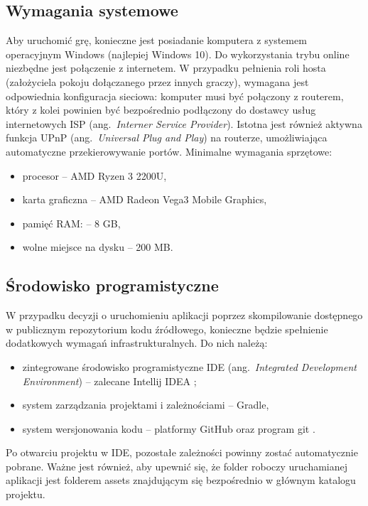 \subsection{Wymagania systemowe}
Aby uruchomić grę, konieczne jest posiadanie komputera z systemem operacyjnym Windows (najlepiej Windows 10). Do wykorzystania trybu online niezbędne jest połączenie z internetem. W przypadku pełnienia roli hosta (założyciela pokoju dołączanego przez innych graczy), wymagana jest odpowiednia konfiguracja sieciowa: komputer musi być połączony z routerem, który z kolei powinien być bezpośrednio podłączony do dostawcy usług internetowych ISP (ang.~\emph{Interner Service Provider}). Istotna jest również aktywna funkcja UPnP (ang.~\emph{Universal Plug and Play}) na routerze, umożliwiająca automatyczne przekierowywanie portów. Minimalne wymagania sprzętowe:
\begin{itemize}
\item procesor -- AMD Ryzen 3 2200U,
\item karta graficzna -- AMD Radeon Vega3 Mobile Graphics,
\item pamięć RAM: -- 8 GB,
\item wolne miejsce na dysku -- 200 MB.
\end{itemize}

\subsection{Środowisko programistyczne}
W przypadku decyzji o uruchomieniu aplikacji poprzez skompilowanie dostępnego w publicznym repozytorium kodu źródłowego, konieczne będzie spełnienie dodatkowych wymagań infrastrukturalnych. Do nich należą:
\begin{itemize}
\item zintegrowane środowisko programistyczne IDE (ang.~\emph{Integrated Development Environment}) -- zalecane Intellij IDEA \cite{IntellijIDEA}; 
\item system zarządzania projektami i zależnościami -- Gradle,
\item system wersjonowania kodu -- platformy GitHub \cite{GitHub} oraz program git \cite{Git}.
\end{itemize}
Po otwarciu projektu w IDE, pozostałe zależności powinny zostać automatycznie pobrane. Ważne jest również, aby upewnić się, że folder roboczy uruchamianej aplikacji jest folderem assets znajdującym się bezpośrednio w głównym katalogu projektu.


